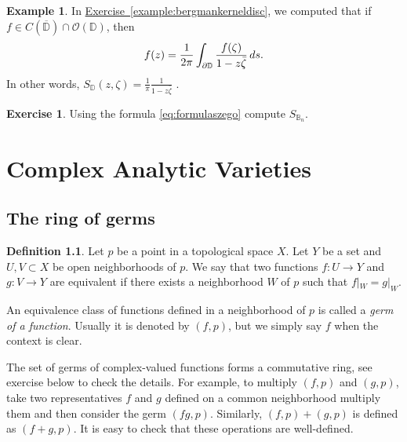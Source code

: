 \documentclass[12pt,openany]{book}
\newcommand{\avoidbreak}{\postdisplaypenalty=100}
\newcommand{\D}{{\mathbb{D}}}
\newcommand{\bB}{{\mathbb{B}}}
\newcommand{\sO}{{\mathscr{O}}}
\newcommand{\myindex}[1]{#1\index{#1}}
\theoremstyle{plain}
\theoremstyle{remark}
\theoremstyle{definition}
\newtheorem{defn}[thm]{Definition}
\newenvironment{exbox}{%
    \def\FrameCommand{\vrule width 1pt \relax\hspace{10pt}}%
    \MakeFramed{\advance\hsize-\width\FrameRestore}%
}{%
    \endMakeFramed
}
\theoremstyle{exercise}
\newtheorem{exercise}{Exercise}[section]
\theoremstyle{example}
\newtheorem{example}[thm]{Example}
\newcommand{\exerciseref}[1]{\hyperref[#1]{Exercise~\ref*{#1}}}
\begin{document}
\begin{example}
In \exerciseref{example:bergmankerneldisc}, we computed that
if $f \in C(\overline{\D}) \cap \sO(\D)$, then
\begin{equation*}
f(z) = \frac{1}{2\pi} \int_{\partial \D} \frac{f(\zeta)}{1-z\bar{\zeta}} \, ds .
\avoidbreak
\end{equation*}
In other words, $S_{\D}(z,\zeta) =
\frac{1}{\pi}
\frac{1}{1-z\bar{\zeta}}$ .
\end{example}

\begin{exbox}
\begin{exercise}
Using the formula \eqref{eq:formulaszego} compute $S_{\bB_n}$.
\end{exercise}
\end{exbox}


\chapter{Complex Analytic Varieties} \label{ch:analyticvarieties}


\section{The ring of germs}

\begin{defn}
Let $p$ be a point in a topological space $X$.  Let $Y$ be a set and
$U, V \subset X$ be open neighborhoods of $p$.  We say that
two functions $f \colon U \to Y$ and
$g \colon V \to Y$ are equivalent if there exists a neighborhood
$W$ of $p$ such that $f|_W = g|_W$.

An equivalence class of functions defined in a neighborhood of $p$
is called a \emph{\myindex{germ of a function}}.
%
Usually it is denoted by $(f,p)$, but we simply say $f$ when
the context is clear.
\end{defn}

The set of germs of complex-valued functions forms a
commutative ring, see exercise below to check the details.
For example, to multiply $(f,p)$ and $(g,p)$, take two representatives
$f$ and $g$ defined on a common neighborhood multiply them and
then consider the germ $(fg,p)$.  Similarly, $(f,p) + (g,p)$ is
defined as $(f+g,p)$.  It is easy to check that these operations are
well-defined.
\end{document}
